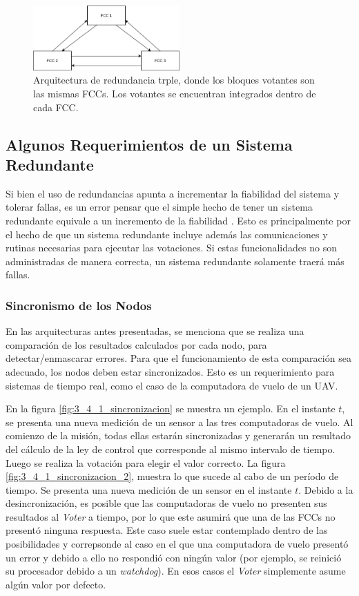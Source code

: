\begin{figure}[H]
    \centering
    \includegraphics[width=0.5\textwidth]{img/3_5_TMR_2.png}
    \caption{Arquitectura de redundancia trple, donde los bloques votantes son las mismas FCCs. Los votantes se encuentran integrados dentro de cada FCC.}
    \label{fig:3_5_TMR_2}
\end{figure}

\subsection{Algunos Requerimientos de un Sistema Redundante}

Si bien el uso de redundancias apunta a incrementar la fiabilidad del sistema y tolerar fallas, es un error pensar que el simple hecho de tener un sistema redundante equivale a un incremento de la fiabilidad \cite{lala1994architectural}. Esto es principalmente por el hecho de que un sistema redundante incluye además las comunicaciones y rutinas necesarias para ejecutar las votaciones. Si estas funcionalidades no son administradas de manera correcta, un sistema redundante solamente traerá más fallas.

\subsubsection{Sincronismo de los Nodos}

En las arquitecturas antes presentadas, se menciona que se realiza una comparación de los resultados calculados por cada nodo, para detectar/enmascarar errores. Para que el funcionamiento de esta comparación sea adecuado, los nodos deben estar sincronizados. Esto es un requerimiento para sistemas de tiempo real, como el caso de la computadora de vuelo de un UAV.

En la figura \ref{fig:3_4_1_sincronizacion} se muestra un ejemplo. En el instante $t$, se presenta una nueva medición de un sensor a las tres computadoras de vuelo. Al comienzo de la misión, todas ellas estarán sincronizadas y generarán un resultado del cálculo de la ley de control que corresponde al mismo intervalo de tiempo. Luego se realiza la votación para elegir el valor correcto. La figura \ref{fig:3_4_1_sincronizacion_2}, muestra lo que sucede al cabo de un período de tiempo. Se presenta una nueva medición de un sensor en el instante $t$. Debido a la desincronización, es posible que las computadoras de vuelo no presenten sus resultados al \textit{Voter} a tiempo, por lo que este asumirá que una de las FCCs no presentó ninguna respuesta. Este caso suele estar contemplado dentro de las posibilidades y correpsonde al caso en el que una computadora de vuelo presentó un error y debido a ello no respondió con ningún valor (por ejemplo, se reinició su procesador debido a un \textit{watchdog}). En esos casos el \textit{Voter} simplemente asume algún valor por defecto.

